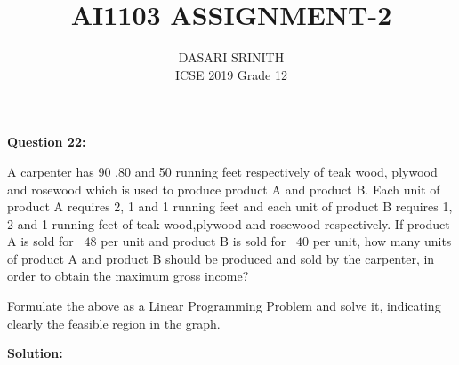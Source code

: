 \documentclass[journal,12pt,twocolumn]{IEEEtran}
\begin{document}
\providecommand{\sbrak}[1]{\ensuremath{{}\left[#1\right]}}
\providecommand{\brak}[1]{\ensuremath{\left(#1\right)}}

\title{AI1103 ASSIGNMENT-2}
\author{DASARI SRINITH \\\vspace*{20pt} \Large ICSE 2019 Grade 12}
\maketitle


\textbf{Question 22:}

A carpenter has 90 ,80 and 50 running feet respectively of teak wood, plywood and rosewood which is used to produce product A and product B.
Each unit of product A requires 2, 1 and 1 running feet and each unit of product B requires 1, 2 and 1 running feet of teak wood,plywood and rosewood respectively. 
If product A is sold for \rupee~$48$ per unit and product B is sold for \rupee~$40$ per unit,
how many units of product A and product B should be produced and sold by the carpenter, in order to obtain the maximum gross income?

Formulate the above as a Linear Programming Problem and solve it, indicating clearly the feasible region in the graph.

\textbf{Solution:}
\end{document}
